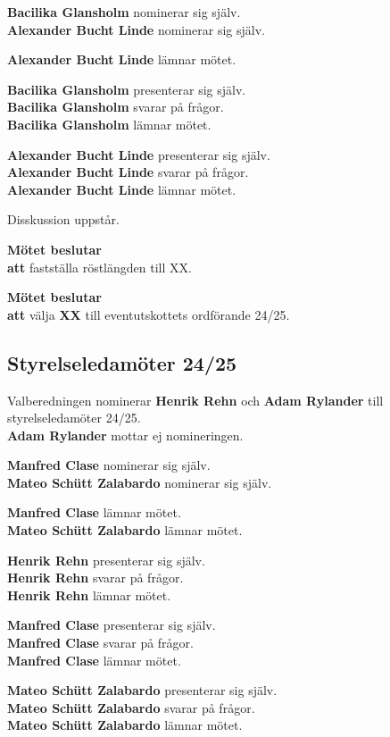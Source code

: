 \documentclass{datateknologsektionen-document}
\newcommand{\ind}{\hspace*{2em}}
\newcommand{\motetbeslutar}{\textbf{Mötet beslutar}}
\newcommand{\att}{\\\ind\textbf{att}}
\begin{document}
\textbf{Bacilika Glansholm} nominerar sig själv. \\
\textbf{Alexander Bucht Linde} nominerar sig själv. 

\textbf{Alexander Bucht Linde} lämnar mötet.

\textbf{Bacilika Glansholm} presenterar sig själv.\\
\textbf{Bacilika Glansholm} svarar på frågor.\\
\textbf{Bacilika Glansholm} lämnar mötet.

\textbf{Alexander Bucht Linde} presenterar sig själv.\\
\textbf{Alexander Bucht Linde} svarar på frågor.\\
\textbf{Alexander Bucht Linde} lämnar mötet.

Disskussion uppstår.

\motetbeslutar
\att{} fastställa röstlängden till XX.

\motetbeslutar
\att{} välja \textbf{XX} till eventutskottets ordförande 24/25.

\subsection{Styrelseledamöter 24/25}

Valberedningen nominerar \textbf{Henrik Rehn} och \textbf{Adam Rylander} till styrelseledamöter 24/25. \\
\textbf{Adam Rylander} mottar ej nomineringen.

\textbf{Manfred Clase} nominerar sig själv. \\
\textbf{Mateo Schütt Zalabardo} nominerar sig själv. 

\textbf{Manfred Clase} lämnar mötet. \\
\textbf{Mateo Schütt Zalabardo} lämnar mötet.

\textbf{Henrik Rehn} presenterar sig själv.\\
\textbf{Henrik Rehn} svarar på frågor.\\
\textbf{Henrik Rehn} lämnar mötet.

\textbf{Manfred Clase} presenterar sig själv.\\
\textbf{Manfred Clase} svarar på frågor.\\
\textbf{Manfred Clase} lämnar mötet.

\textbf{Mateo Schütt Zalabardo} presenterar sig själv.\\
\textbf{Mateo Schütt Zalabardo} svarar på frågor.\\
\textbf{Mateo Schütt Zalabardo} lämnar mötet.
\end{document}
